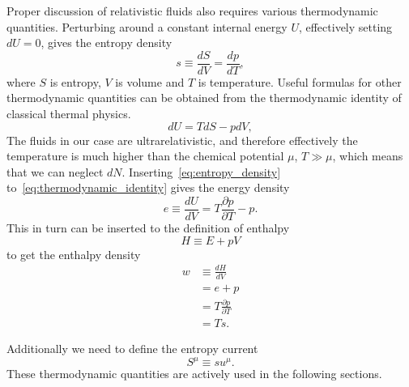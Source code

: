 Proper discussion of relativistic fluids also requires various thermodynamic quantities.
Perturbing around a constant internal energy $U$,
effectively setting $dU=0$,
gives the entropy density
\cite[p. 23]{lecture_notes}
\begin{equation}
s \equiv \frac{dS}{dV} = \frac{dp}{dT},
\label{eq:entropy_density}
\end{equation}
where $S$ is entropy, $V$ is volume and $T$ is temperature.
Useful formulas for other thermodynamic quantities can be obtained from the thermodynamic identity of classical thermal physics.
\cites[eq. 2.136]{rezzolla_relativistic_2013}[eq. 3.68]{schroeder_thermal_2000}
\begin{equation}
dU = TdS - pdV, %
\label{eq:thermodynamic_identity}
\end{equation}
The fluids in our case are ultrarelativistic,
and therefore effectively the temperature is much higher than the chemical potential $\mu$,
$T \gg \mu$,
which means that we can neglect $dN$.
Inserting~\eqref{eq:entropy_density} to~\eqref{eq:thermodynamic_identity} gives the energy density
\begin{equation}
e \equiv \frac{dU}{dV} = T \frac{\partial p}{\partial T} - p.
\label{eq:energy_density}
\end{equation}
This in turn can be inserted to the definition of enthalpy
\cite[eq. 1.51]{schroeder_thermal_2000}
\begin{equation}
H \equiv E + pV
\end{equation}
to get the enthalpy density
\begin{align}
w
&\equiv \frac{dH}{dV} \\
&= e+p
\label{eq:enthalpy_sum} \\
&= T \frac{\partial p}{\partial T}
\label{eq:enthalpy_pressure}\\
&= Ts.
\label{eq:enthalpy_entropy}
\end{align}

Additionally we need to define the entropy current
\cite[p. 23]{lecture_notes}
\begin{equation}
S^\mu \equiv su^\mu.
\end{equation}
These thermodynamic quantities are actively used in the following sections.


